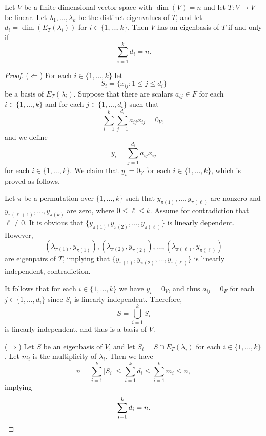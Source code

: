 \begin{theorem}
  Let $V$ be a finite-dimensional vector space with $\dim(V) = n$ and let
  $T: V \to V$ be linear.
  Let $\lambda_1, \dots, \lambda_k$ be the distinct eigenvalues of $T$, and let
  $d_i = \dim(E_T(\lambda_i))$ for $i \in \{1, \dots, k\}$.
  Then $V$ has an eigenbasis of $T$ if and only if
  \begin{equation*}
    \sum_{i=1}^k d_i = n.
  \end{equation*}
\end{theorem}
\begin{proof}
  ($\Leftarrow$)
  For each $i \in \{1, \dots, k\}$ let
  \begin{equation*}
    S_i = \{x_{ij}: 1 \leq j \leq d_i\}
  \end{equation*}
  be a basis of $E_T(\lambda_i)$.
  Suppose that there are scalars $a_{ij} \in F$ for each $i \in
  \{1, \dots, k\}$ and for each $j \in \{1, \dots, d_i\}$ such that
  \begin{equation*}
    \sum_{i=1}^k \sum_{j=1}^{d_i} a_{ij}x_{ij} = 0_V,
  \end{equation*}
  and we define
  \begin{equation*}
    y_i = \sum_{j=1}^{d_i} a_{ij}x_{ij}
  \end{equation*}
  for each $i \in \{1, \dots, k\}$.
  We claim that $y_i = 0_V$ for each $i \in \{1, \dots, k\}$, which is proved
  as follows.

  Let $\pi$ be a permutation over $\{1, \dots, k\}$ such that
  $y_{\pi(1)}, \dots, y_{\pi(\ell)}$ are nonzero and
  $y_{\pi(\ell+1)}, \dots, y_{\pi(k)}$ are zero, where $0 \leq \ell \leq k$.
  Assume for contradiction that $\ell \neq 0$.
  It is obvious that $\{y_{\pi(1)}, y_{\pi(2)}, \dots, y_{\pi(\ell)}\}$ is
  linearly dependent.
  However,
  \begin{equation*}
    (\lambda_{\pi(1)}, y_{\pi(1)}),
    (\lambda_{\pi(2)}, y_{\pi(2)}),
    \dots,
    (\lambda_{\pi(\ell)}, y_{\pi(\ell)})
  \end{equation*}
  are eigenpairs of $T$, implying that $\{y_{\pi(1)}, y_{\pi(2)}, \dots,
  y_{\pi(\ell)}\}$ is linearly independent, contradiction.

  It follows that for each $i \in \{1, \dots, k\}$ we have $y_i = 0_V$, and
  thus $a_{ij} = 0_F$ for each $j \in \{1, \dots, d_i\}$ since $S_i$ is
  linearly independent.
  Therefore,
  \begin{equation*}
    S = \bigcup_{i=1}^k S_i
  \end{equation*}
  is linearly independent, and thus is a basis of $V$.

  ($\Rightarrow$)
  Let $S$ be an eigenbasis of $V$, and let $S_i = S \cap E_T(\lambda_i)$ for
  each $i \in \{1, \dots, k\}$.
  Let $m_i$ is the multiplicity of $\lambda_i$.
  Then we have
  \begin{equation*}
    n
    = \sum_{i=1}^k |S_i|
    \leq \sum_{i=1}^k d_i
    \leq \sum_{i=1}^k m_i
    \leq n,
  \end{equation*}
  implying
  \begin{equation*}
    \sum_{i=1}^k d_i = n.
    \qedhere
  \end{equation*}
\end{proof}

